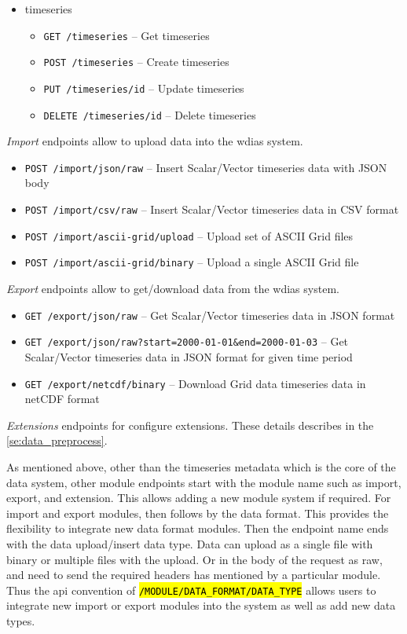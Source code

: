 \begin{itemize}
\begin{itemize}
    \end{itemize}
    \item timeseries
    \begin{itemize}
        \item \texttt{GET /timeseries} -- Get timeseries
        \item \texttt{POST /timeseries} -- Create timeseries
        \item \texttt{PUT /timeseries/id} -- Update timeseries
        \item \texttt{DELETE /timeseries/id} -- Delete timeseries
    \end{itemize}
\end{itemize}

\emph{Import} endpoints allow to upload data into the \acrshort{wdias} system.
\begin{itemize}
    \item \texttt{POST /import/json/raw} -- Insert Scalar/Vector timeseries data with JSON body
    \item \texttt{POST /import/csv/raw} -- Insert Scalar/Vector timeseries data in CSV format
    \item \texttt{POST /import/ascii-grid/upload} -- Upload set of ASCII Grid files
    \item \texttt{POST /import/ascii-grid/binary} -- Upload a single ASCII Grid file
\end{itemize}

\emph{Export} endpoints allow to get/download data from the \acrshort{wdias} system.
\begin{itemize}
    \item \texttt{GET /export/json/raw} -- Get Scalar/Vector timeseries data in JSON format
    \item \texttt{GET /export/json/raw?start=2000-01-01\&end=2000-01-03} -- Get Scalar/Vector timeseries data in JSON format for given time period
    \item \texttt{GET /export/netcdf/binary} -- Download Grid data timeseries data in \acrshort{netCDF} format
\end{itemize}

\emph{Extensions} endpoints for configure extensions. These details describes in the \cref{se:data_preprocess}.

As mentioned above, other than the timeseries metadata which is the core of the data system, other module endpoints start with the module name such as import, export, and extension. This allows adding a new module system if required. 
For import and export modules, then follows by the data format. This provides the flexibility to integrate new data format modules. 
Then the endpoint name ends with the data upload/insert data type. Data can upload as a single file with binary or multiple files with the upload. Or in the body of the request as raw, and need to send the required headers has mentioned by a particular module.
Thus the \acrshort{api} convention of \texttt{\hl{/MODULE/DATA\_FORMAT/DATA\_TYPE}} allows users to integrate new import or export modules into the system as well as add new data types.
